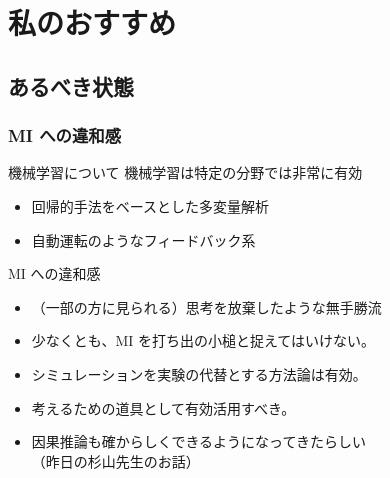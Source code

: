 \documentclass[12pt, dvipdfmx]{beamer}
\begin{document}
\section{私のおすすめ}
\subsection{あるべき状態}
\begin{frame}
    \frametitle{MI への違和感}
    \begin{block}{機械学習について}
        機械学習は特定の分野では非常に有効
        \begin{itemize}
            \item 回帰的手法をベースとした多変量解析
            \item 自動運転のようなフィードバック系
        \end{itemize}
    \end{block}
    \begin{exampleblock}{MI への違和感}
        
        \begin{itemize}
            \item （一部の方に見られる）思考を放棄したような無手勝流
            \item 少なくとも、MI を打ち出の小槌と捉えてはいけない。
            \item シミュレーションを実験の代替とする方法論は有効。
            \item 考えるための道具として有効活用すべき。
            \item 因果推論も確からしくできるようになってきたらしい\\（昨日の杉山先生のお話）
        \end{itemize}
    \end{exampleblock}
\end{frame}
\end{document}
